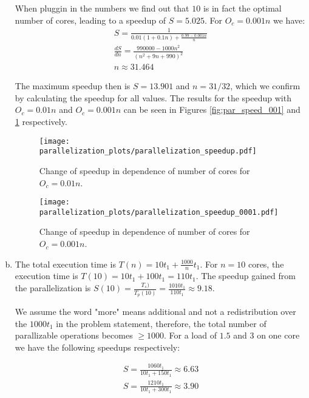 \documentclass[a4paper,10pt]{article} %
\begin{document}
\begin{enumerate}[a)]
When pluggin in the numbers we find out that $10$ is in fact the optimal number of cores, leading to a speedup of $S = 5.025$.
For $O_c = 0.001n$ we have:
\begin{equation}
\begin{split}
    S = \frac{1}{0.01(1 + 0.1n) + \frac{0.99 - 0.001n}{n}} \\
    \frac{dS}{dn} = \frac{990000 - 1000n^2}{(n^2 + 9n + 990)^2} \\
    n \approx 31.464
\end{split}
\end{equation}

The maximum speedup then is $S = 13.901$ and $n = 31 / 32$, which we confirm by calculating the speedup for all values. The results for the speedup with $O_c = 0.01n$ and $O_c = 0.001n$ can be seen in Figures \ref{fig:par_speed_001} and \ref{fig:par_speed_0001} respectively.

\begin{figure}[h]
  \centering
  \begin{minipage}[t]{0.45\textwidth}
    \texttt{[image: parallelization\_plots/parallelization\_speedup.pdf]}
    \caption{Change of speedup in dependence of number of cores for $O_c = 0.01n$.}
    \label{fig:par_speed_001}
  \end{minipage}
  \hfill
  \begin{minipage}[t]{0.45\textwidth}
    \texttt{[image: parallelization\_plots/parallelization\_speedup\_0001.pdf]}
    \caption{Change of speedup in dependence of number of cores for $O_c = 0.001n$.}
    \label{fig:par_speed_0001}
  \end{minipage}
\end{figure}

\item
The total execution time is $T(n) = 10t_1 + \frac{1000}{n}t_1$. For $n = 10$ cores, the execution time is $T(10) = 10t_1 + 100t_1 = 110t_1$. The speedup gained from the parallelization is $S(10) = \frac{T_s)}{T_p(10)} = \frac{1010t_1}{110t_1} \approx 9.18$.

We assume the word "more" means additional and not a redistribution over the $1000t_1$ in the problem statement, therefore, the total number of parallizable operations becomes $\ge 1000$. For a load of $1.5$ and $3$ on one core we have the following speedups respectively:

\begin{equation}
\begin{split}
    S = \frac{1060t_1}{10t_1 + 150t_1} \approx 6.63 \\
    S = \frac{1210t_1}{10t_1 + 300t_1} \approx 3.90
\end{split}
\end{equation}

\end{enumerate}
\end{document}
